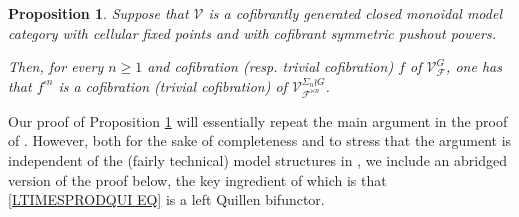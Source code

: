 \documentclass[a4paper,10pt
,draft
]{article}%
\numberwithin{equation}{section}
\numberwithin{figure}{section}
\newtheorem{proposition}[equation]{Proposition}%
\theoremstyle{definition} %
\newcommand{\1}{\ensuremath{\mathbbm 1}}%
\begin{document}
\begin{proposition}\label{POWERF PROP}
	Suppose that $\mathcal{V}$ is a cofibrantly generated closed monoidal model category with cellular fixed points and with cofibrant symmetric pushout powers.
	
	Then, for every $n \geq 1$ and cofibration (resp. trivial cofibration) $f$ of $\mathcal{V}^{G}_{\mathcal{F}}$,
	one has that $f^{\square n}$ is a cofibration (trivial cofibration) of $\mathcal{V}^{\Sigma_n \wr G}_{\mathcal{F}^{\ltimes n}}$.
\end{proposition}


Our proof of Proposition \ref{POWERF PROP} will essentially repeat the main argument in the proof of
\cite[Thm. 1.2]{Pe16}.
However, both for the sake of completeness and to stress that the argument is independent of the (fairly technical) model structures in \cite{Pe16}, we include an abridged version of the proof below, the key ingredient 
of which is that \eqref{LTIMESPRODQUI EQ} is a left Quillen bifunctor. 
\end{document}
